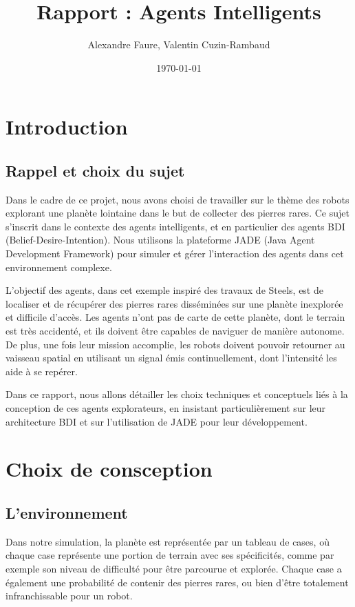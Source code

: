 \documentclass{article}
\title{Rapport : Agents Intelligents}
\author{Alexandre Faure, Valentin Cuzin-Rambaud}
\date{\today}
\begin{document}
\maketitle

\section{Introduction}

\subsection{Rappel et choix du sujet}

Dans le cadre de ce projet, nous avons choisi de travailler sur le thème des robots explorant une planète lointaine dans le but de collecter des pierres rares. Ce sujet s'inscrit dans le contexte des agents intelligents, et en particulier des agents BDI (Belief-Desire-Intention). Nous utilisons la plateforme JADE (Java Agent Development Framework) pour simuler et gérer l'interaction des agents dans cet environnement complexe.

L’objectif des agents, dans cet exemple inspiré des travaux de Steels, est de localiser et de récupérer des pierres rares disséminées sur une planète inexplorée et difficile d'accès. Les agents n'ont pas de carte de cette planète, dont le terrain est très accidenté, et ils doivent être capables de naviguer de manière autonome. De plus, une fois leur mission accomplie, les robots doivent pouvoir retourner au vaisseau spatial en utilisant un signal émis continuellement, dont l’intensité les aide à se repérer.

Dans ce rapport, nous allons détailler les choix techniques et conceptuels liés à la conception de ces agents explorateurs, en insistant particulièrement sur leur architecture BDI et sur l'utilisation de JADE pour leur développement.

\section{Choix de consception}

\subsection{L'environnement}

Dans notre simulation, la planète est représentée par un tableau de cases, où chaque case représente une portion de terrain avec ses spécificités, comme par exemple son niveau de difficulté pour être parcourue et explorée. Chaque case a également une probabilité de contenir des pierres rares, ou bien d'être totalement infranchissable pour un robot. 
\end{document}
